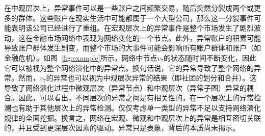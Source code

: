 在中观层次上，异常事件可以是一些账户之间频繁交易，随后突然分裂成两个或更多的群体。这些账户在现实生活中可能都属于一个大型公司，那么这一分裂事件可能表明该公司已经进行了重组。在宏观层次上的异常事件是整个市场发生了剧烈波动，这在金融市场网络中表现为网络变化的一个节点。此外，异常账户的积累可能导致账户群体发生剧变，而整个市场的大事件可能会影响所有账户群体和账户（如金融危机）。如图~\ref{fig:example}所示，网络中节点$v_{7}$的状态随时间不断变化，因此它可以被视为整个网络演化中的异常点。换句话说，它的异常导致了整个网络的异常。然而，$v_{7}$的异常也可以视为中观层次异常的结果（即社团的划分和合并）。这导致了网络演化过程中微观层次（异常节点）和中观层次（异常子图）异常的耦合。因此，可以看出，不同层次的异常之间是有相关性的，在一个层次上的异常检测也有助于其他层次上的异常检测。仅仅考虑单一类型的异常不足以支持网络演化规律的全面挖掘。换言之，网络在宏观、微观和中观层次上的异常是相互密切关联的，并且受到更深层次因素的驱动。异常只是表象，背后的本质尚未揭示。

